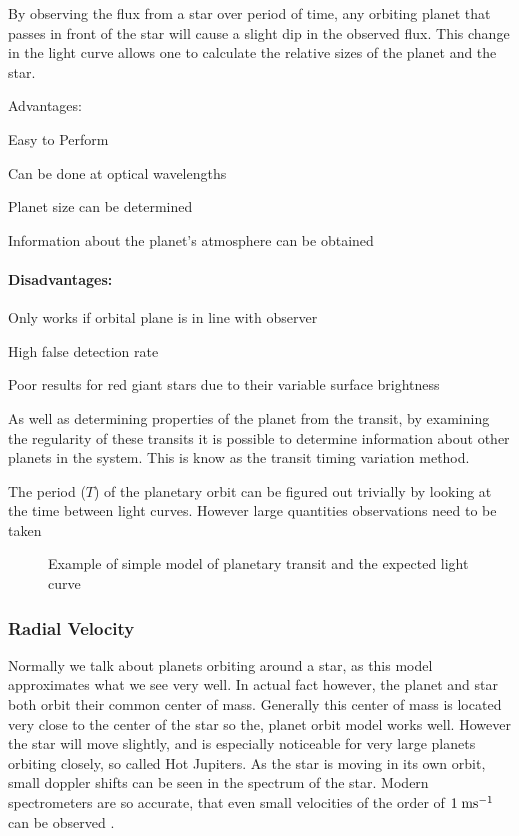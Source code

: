 By observing the flux from a star over period of time, any orbiting planet that passes in front of the star will cause a slight dip in the observed flux. This change in the light curve allows one to calculate the relative sizes of the planet and the star.

Advantages:
\begin{itemize*}
    \item Easy to Perform
    \item Can be done at optical wavelengths
    \item Planet size can be determined
    \item Information about the planet's atmosphere can be obtained \citep{fortney2006atmosphere}
\end{itemize*}

\paragraph{Disadvantages:}
\begin{itemize*}
    \item Only works if orbital plane is in line with observer
    \item High false detection rate \citep{santerne2012sophie}
    \item Poor results for red giant stars due to their variable surface brightness
\end{itemize*}

As well as determining properties of the planet from the transit, by examining the regularity of these transits it is possible to determine information about other planets in the system. This is know as the transit timing variation method.

The period ($T$) of the planetary orbit can be figured out trivially by looking at the time between light curves. However large quantities observations need to be taken 

\begin{figure}
    \centering
    \def\svgwidth{\columnwidth}
    
    \caption{Example of simple model of planetary transit and the expected light curve}
    \label{fig:transit}
\end{figure}

\subsubsection{Radial Velocity}

Normally we talk about planets orbiting around a star, as this model approximates what we see very well. In actual fact however, the planet and star both orbit their common center of mass. Generally this center of mass is located very close to the center of the star so the, planet orbit model works well. However the star will move slightly, and is especially noticeable for very large planets orbiting closely, so called Hot Jupiters. As the star is moving in its own orbit, small doppler shifts can be seen in the spectrum of the star. Modern spectrometers are so accurate, that even small velocities of the order of $1\;\mathrm{ms^{-1}}$ can be observed \citep{ge2002externally}.


